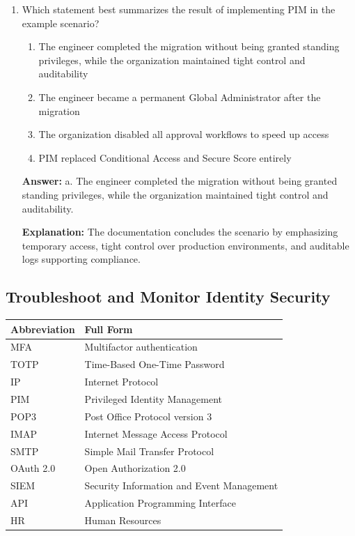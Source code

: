 \documentclass[10pt]{article}
\begin{document}
\begin{enumerate}[leftmargin=*]
\item Which statement best summarizes the result of implementing PIM in the example scenario?
\begin{enumerate}[label=\alph*., leftmargin=1.5em]
\item The engineer completed the migration without being granted standing privileges, while the organization maintained tight control and auditability
\item The engineer became a permanent Global Administrator after the migration
\item The organization disabled all approval workflows to speed up access
\item PIM replaced Conditional Access and Secure Score entirely
\end{enumerate}
\textbf{Answer:} a. The engineer completed the migration without being granted standing privileges, while the organization maintained tight control and auditability.

\textbf{Explanation:} The documentation concludes the scenario by emphasizing temporary access, tight control over production environments, and auditable logs supporting compliance.

\end{enumerate}

\clearpage
\subsection{Troubleshoot and Monitor Identity Security}

\begin{center}
\begin{tabular}{>{\raggedright\arraybackslash}p{} >{\raggedright\arraybackslash}p{}}
\toprule
\textbf{Abbreviation} & \textbf{Full Form} \\
\midrule
MFA & Multifactor authentication \\
TOTP & Time-Based One-Time Password \\
IP & Internet Protocol \\
PIM & Privileged Identity Management \\
POP3 & Post Office Protocol version 3 \\
IMAP & Internet Message Access Protocol \\
SMTP & Simple Mail Transfer Protocol \\
OAuth 2.0 & Open Authorization 2.0 \\
SIEM & Security Information and Event Management \\
API & Application Programming Interface \\
HR & Human Resources \\
\bottomrule
\end{tabular}
\end{center}
\end{document}
